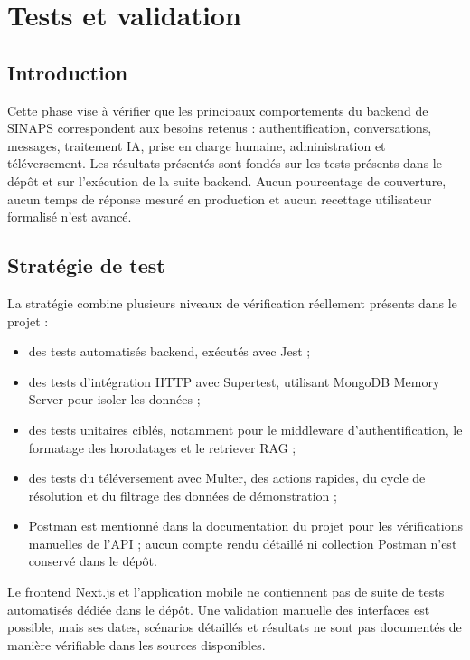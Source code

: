 \chapter{Tests et validation}

\section{Introduction}

Cette phase vise à vérifier que les principaux comportements du backend de SINAPS correspondent aux besoins retenus : authentification, conversations, messages, traitement IA, prise en charge humaine, administration et téléversement. Les résultats présentés sont fondés sur les tests présents dans le dépôt et sur l'exécution de la suite backend. Aucun pourcentage de couverture, aucun temps de réponse mesuré en production et aucun recettage utilisateur formalisé n'est avancé.

\section{Stratégie de test}

La stratégie combine plusieurs niveaux de vérification réellement présents dans le projet :

\begin{itemize}[leftmargin=1.4em]
  \item des tests automatisés backend, exécutés avec Jest ;
  \item des tests d'intégration HTTP avec Supertest, utilisant MongoDB Memory Server pour isoler les données ;
  \item des tests unitaires ciblés, notamment pour le middleware d'authentification, le formatage des horodatages et le retriever RAG ;
  \item des tests du téléversement avec Multer, des actions rapides, du cycle de résolution et du filtrage des données de démonstration ;
  \item Postman est mentionné dans la documentation du projet pour les vérifications manuelles de l'API ; aucun compte rendu détaillé ni collection Postman n'est conservé dans le dépôt.
\end{itemize}

Le frontend Next.js et l'application mobile ne contiennent pas de suite de tests automatisés dédiée dans le dépôt. Une validation manuelle des interfaces est possible, mais ses dates, scénarios détaillés et résultats ne sont pas documentés de manière vérifiable dans les sources disponibles.

